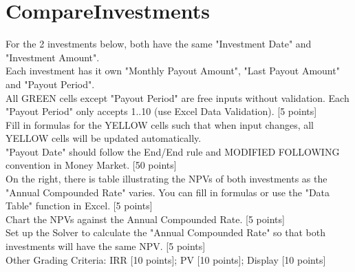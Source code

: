\section{CompareInvestments}

For the 2 investments below, both have the same "Investment Date" and "Investment Amount".	\\ 	
Each investment has it own "Monthly Payout Amount", "Last Payout Amount" and "Payout Period".	\\ 	
All GREEN cells except "Payout Period" are free inputs without validation. Each "Payout Period" only accepts 1..10 (use Excel Data Validation). [5 points]	\\
Fill in formulas for the YELLOW cells such that when input changes, all YELLOW cells will be updated automatically.		 \\
"Payout Date" should follow the End/End rule and MODIFIED FOLLOWING convention in Money Market. [50 points]		 \\ 
On the right, there is table illustrating the NPVs of both investments as the "Annual Compounded Rate" varies. You can fill in formulas or use the "Data Table" function in Excel. [5 points]	\\	
Chart the NPVs against the Annual Compounded Rate. [5 points]		\\
Set up the Solver to calculate the "Annual Compounded Rate" so that both investments will have the same NPV. [5 points]		\\
Other Grading Criteria: IRR [10 points]; PV [10 points]; Display [10 points]

